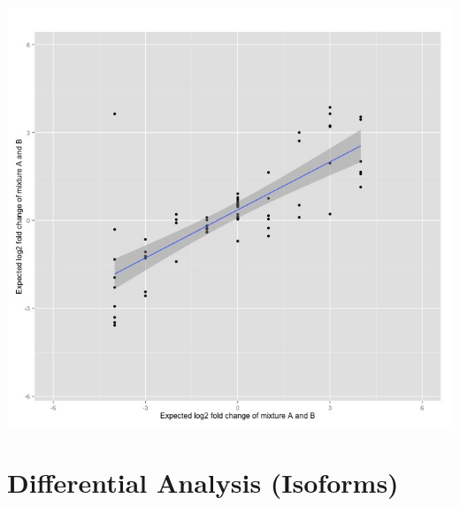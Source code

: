 \documentclass[]{article}
\begin{document}
\includegraphics{4.jpeg}

\pagebreak

\section{Differential Analysis
(Isoforms)}\label{differential-analysis-isoforms}
\end{document}
